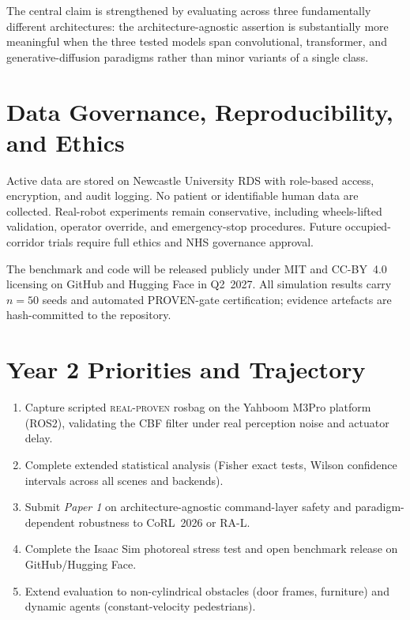 \documentclass[12pt,a4paper]{article}
\begin{document}
The central claim is strengthened by evaluating across three fundamentally
different architectures: the architecture-agnostic assertion is substantially
more meaningful when the three tested models span convolutional, transformer,
and generative-diffusion paradigms rather than minor variants of a single class.

\section{Data Governance, Reproducibility, and Ethics}
\label{sec:governance}

Active data are stored on Newcastle University RDS with role-based access,
encryption, and audit logging. No patient or identifiable human data are
collected. Real-robot experiments remain conservative, including wheels-lifted
validation, operator override, and emergency-stop procedures. Future
occupied-corridor trials require full ethics and NHS governance approval.

The benchmark and code will be released publicly under MIT and CC-BY~4.0
licensing on GitHub and Hugging Face in Q2~2027. All simulation results carry
$n = 50$ seeds and automated PROVEN-gate certification; evidence artefacts
are hash-committed to the repository.

\section{Year 2 Priorities and Trajectory}
\label{sec:year2}

\begin{enumerate}[leftmargin=*, label=\arabic*.]
  \item Capture scripted \textsc{real-proven} rosbag on the Yahboom M3Pro
    platform (ROS2), validating the CBF filter under real perception noise
    and actuator delay.
  \item Complete extended statistical analysis (Fisher exact tests,
    Wilson confidence intervals across all scenes and backends).
  \item Submit \textit{Paper 1} on architecture-agnostic command-layer safety
    and paradigm-dependent robustness to CoRL~2026 or RA-L.
  \item Complete the Isaac Sim photoreal stress test and open benchmark
    release on GitHub/Hugging Face.
  \item Extend evaluation to non-cylindrical obstacles (door frames,
    furniture) and dynamic agents (constant-velocity pedestrians).
\end{enumerate}
\end{document}
